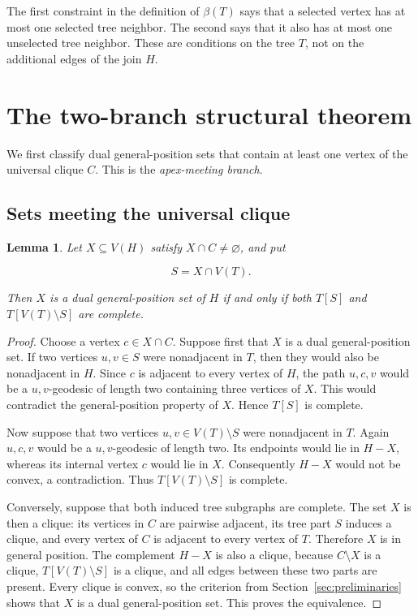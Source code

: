 \documentclass[11pt,a4paper]{article}
\newtheorem{lemma}[theorem]{Lemma}
\numberwithin{equation}{section}
\begin{document}
The first constraint in the definition of \(\beta(T)\) says that a
selected vertex has at most one selected tree neighbor. The second says
that it also has at most one unselected tree neighbor. These are
conditions on the tree \(T\), not on the additional edges of the join
\(H\).

\section{The two-branch structural theorem}\label{sec:structure}

We first classify dual general-position sets that contain at least one
vertex of the universal clique \(C\). This is the \emph{apex-meeting
branch}.

\subsection{Sets meeting the universal clique}\label{sec:apex-meeting}

\begin{lemma}\label{lem:apex-meeting}
Let \(X\subseteq V(H)\) satisfy
\(X\cap C\ne\varnothing\), and put

\[
S=X\cap V(T).
\]

Then \(X\) is a dual general-position set of \(H\) if and only if both
\(T[S]\) and \(T[V(T)\setminus S]\) are complete.
\end{lemma}

\begin{proof}
Choose a vertex \(c\in X\cap C\). Suppose first that
\(X\) is a dual general-position set. If two vertices \(u,v\in S\) were
nonadjacent in \(T\), then they would also be nonadjacent in \(H\).
Since \(c\) is adjacent to every vertex of \(H\), the path \(u,c,v\)
would be a \(u,v\)-geodesic of length two containing three vertices of
\(X\). This would contradict the general-position property of \(X\).
Hence \(T[S]\) is complete.

Now suppose that two vertices \(u,v\in V(T)\setminus S\) were
nonadjacent in \(T\). Again \(u,c,v\) would be a \(u,v\)-geodesic of
length two. Its endpoints would lie in \(H-X\), whereas its internal
vertex \(c\) would lie in \(X\). Consequently \(H-X\) would not be
convex, a contradiction. Thus \(T[V(T)\setminus S]\) is complete.

Conversely, suppose that both induced tree subgraphs are complete. The
set \(X\) is then a clique: its vertices in \(C\) are pairwise adjacent,
its tree part \(S\) induces a clique, and every vertex of \(C\) is
adjacent to every vertex of \(T\). Therefore \(X\) is in general
position. The complement \(H-X\) is also a clique, because
\(C\setminus X\) is a clique, \(T[V(T)\setminus S]\) is a clique, and
all edges between these two parts are present. Every clique is convex,
so the criterion from Section~\ref{sec:preliminaries} shows that \(X\) is a dual
general-position set. This proves the equivalence.
\end{proof}
\end{document}
